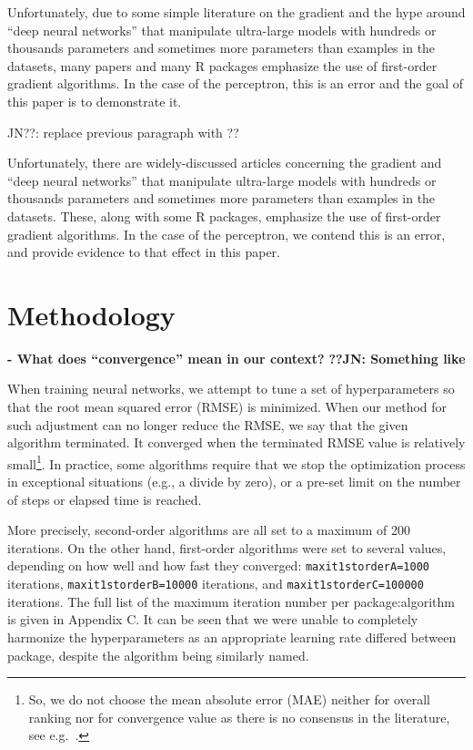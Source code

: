 Unfortunately, due to some simple literature on the gradient and the
hype around ``deep neural networks'' that manipulate ultra-large models
with hundreds or thousands parameters and sometimes more parameters than
examples in the datasets, many papers and many R packages emphasize the
use of first-order gradient algorithms. In the case of the perceptron,
this is an error and the goal of this paper is to demonstrate it.

JN??: replace previous paragraph with ??

Unfortunately, there are widely-discussed articles concerning the
gradient and ``deep neural networks'' that manipulate ultra-large models
with hundreds or thousands parameters and sometimes more parameters than
examples in the datasets. These, along with some R packages, emphasize
the use of first-order gradient algorithms. In the case of the
perceptron, we contend this is an error, and provide evidence to that
effect in this paper.

\hypertarget{methodology}{%
\section{Methodology}\label{methodology}}

\textbf{- What does ``convergence'' mean in our context?} \textbf{??JN:
Something like}

When training neural networks, we attempt to tune a set of
hyperparameters so that the root mean squared error (RMSE) is minimized.
When our method for such adjustment can no longer reduce the RMSE, we
say that the given algorithm terminated. It converged when the
terminated RMSE value is relatively small\footnote{So, we do not choose
  the mean absolute error (MAE) neither for overall ranking nor for
  convergence value as there is no consensus in the literature, see
  e.g.~\citep{willmott2005advantages,chai2014root}.}. In practice, some
algorithms require that we stop the optimization process in exceptional
situations (e.g., a divide by zero), or a pre-set limit on the number of
steps or elapsed time is reached.

More precisely, second-order algorithms are all set to a maximum of 200
iterations. On the other hand, first-order algorithms were set to
several values, depending on how well and how fast they converged:
\texttt{maxit1storderA=1000} iterations, \texttt{maxit1storderB=10000}
iterations, and \texttt{maxit1storderC=100000} iterations. The full list
of the maximum iteration number per package:algorithm is given in
Appendix C. It can be seen that we were unable to completely harmonize
the hyperparameters as an appropriate learning rate differed between
package, despite the algorithm being similarly named.

